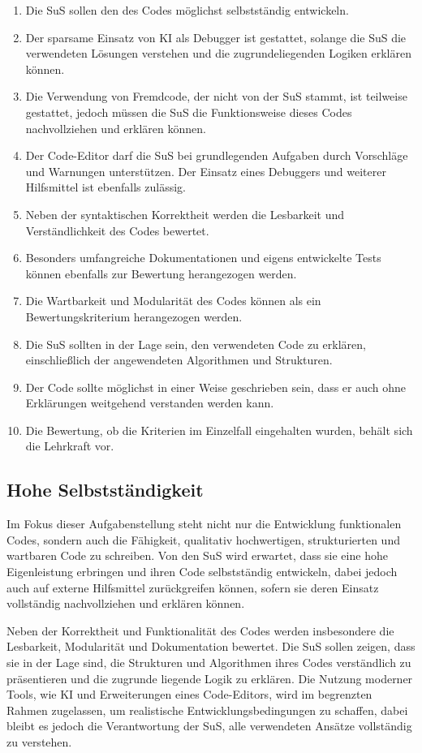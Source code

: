 \documentclass[a4paper,12pt]{article}
\begin{document}
\begin{enumerate}[label=\S\ \arabic*]
    \item Die SuS sollen den des Codes möglichst selbstständig entwickeln.
    \item Der sparsame Einsatz von KI als Debugger ist gestattet, solange die SuS die verwendeten Lösungen verstehen und die zugrundeliegenden Logiken erklären können.
    \item Die Verwendung von Fremdcode, der nicht von der SuS stammt, ist teilweise gestattet, jedoch müssen die SuS die Funktionsweise dieses Codes nachvollziehen und erklären können.
    \item Der Code-Editor darf die SuS bei grundlegenden Aufgaben durch Vorschläge und Warnungen unterstützen. Der Einsatz eines Debuggers und weiterer Hilfsmittel ist ebenfalls zulässig.
    \item Neben der syntaktischen Korrektheit werden die Lesbarkeit und Verständlichkeit des Codes bewertet.
    \item Besonders umfangreiche Dokumentationen und eigens entwickelte Tests können ebenfalls zur Bewertung herangezogen werden.
    \item Die Wartbarkeit und Modularität des Codes können als ein Bewertungskriterium herangezogen werden.
    \item Die SuS sollten in der Lage sein, den verwendeten Code zu erklären, einschließlich der angewendeten Algorithmen und Strukturen.
    \item Der Code sollte möglichst in einer Weise geschrieben sein, dass er auch ohne Erklärungen weitgehend verstanden werden kann.
    \item Die Bewertung, ob die Kriterien im Einzelfall eingehalten wurden, behält sich die Lehrkraft vor.
\end{enumerate}


\subsection{Hohe Selbstständigkeit}
Im Fokus dieser Aufgabenstellung steht nicht nur die Entwicklung funktionalen Codes, sondern auch die Fähigkeit, qualitativ hochwertigen, strukturierten und wartbaren Code zu schreiben. Von den SuS wird erwartet, dass sie eine hohe Eigenleistung erbringen und ihren Code selbstständig entwickeln, dabei jedoch auch auf externe Hilfsmittel zurückgreifen können, sofern sie deren Einsatz vollständig nachvollziehen und erklären können.

Neben der Korrektheit und Funktionalität des Codes werden insbesondere die Lesbarkeit, Modularität und Dokumentation bewertet. Die SuS sollen zeigen, dass sie in der Lage sind, die Strukturen und Algorithmen ihres Codes verständlich zu präsentieren und die zugrunde liegende Logik zu erklären. Die Nutzung moderner Tools, wie KI und Erweiterungen eines Code-Editors, wird im begrenzten Rahmen zugelassen, um realistische Entwicklungsbedingungen zu schaffen, dabei bleibt es jedoch die Verantwortung der SuS, alle verwendeten Ansätze vollständig zu verstehen.
\end{document}
